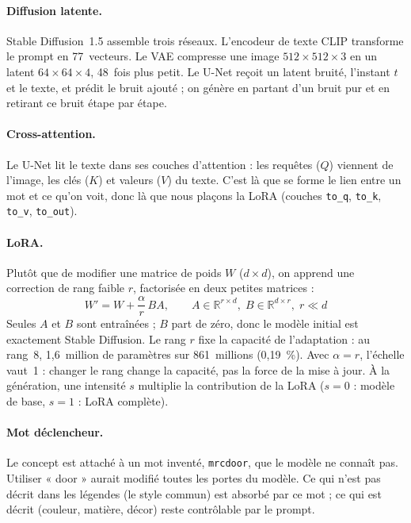 \documentclass[11pt,a4paper]{article}
\newcommand{\code}[1]{\texttt{\small #1}}
\newcommand{\trig}{\code{mrcdoor}}
\begin{document}
\paragraph{Diffusion latente.} Stable Diffusion~1.5 assemble trois réseaux. L'encodeur de texte CLIP transforme le prompt en 77~vecteurs. Le VAE compresse une image $512\times512\times3$ en un latent $64\times64\times4$, 48~fois plus petit. Le U-Net reçoit un latent bruité, l'instant $t$ et le texte, et prédit le bruit ajouté ; on génère en partant d'un bruit pur et en retirant ce bruit étape par étape.

\paragraph{Cross-attention.} Le U-Net lit le texte dans ses couches d'attention : les requêtes ($Q$) viennent de l'image, les clés ($K$) et valeurs ($V$) du texte. C'est là que se forme le lien entre un mot et ce qu'on voit, donc là que nous plaçons la LoRA (couches \code{to\_q}, \code{to\_k}, \code{to\_v}, \code{to\_out}).

\paragraph{LoRA.} Plutôt que de modifier une matrice de poids $W$ ($d\times d$), on apprend une correction de rang faible $r$, factorisée en deux petites matrices :
\begin{equation}
W' = W + \frac{\alpha}{r}\, B A, \qquad A \in \mathbb{R}^{r \times d},\; B \in \mathbb{R}^{d \times r},\; r \ll d
\end{equation}
Seules $A$ et $B$ sont entraînées ; $B$ part de zéro, donc le modèle initial est exactement Stable Diffusion. Le rang $r$ fixe la capacité de l'adaptation : au rang~8, 1,6~million de paramètres sur 861~millions (0,19~\%). Avec $\alpha = r$, l'échelle vaut~1 : changer le rang change la capacité, pas la force de la mise à jour. À la génération, une intensité $s$ multiplie la contribution de la LoRA ($s=0$ : modèle de base, $s=1$ : LoRA complète).

\paragraph{Mot déclencheur.} Le concept est attaché à un mot inventé, \trig, que le modèle ne connaît pas. Utiliser « door » aurait modifié toutes les portes du modèle. Ce qui n'est pas décrit dans les légendes (le style commun) est absorbé par ce mot ; ce qui est décrit (couleur, matière, décor) reste contrôlable par le prompt.
\end{document}
